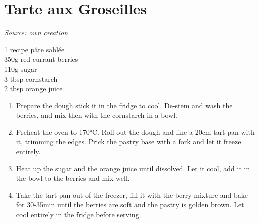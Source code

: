 \documentclass{report}
\begin{document}
\section{Tarte aux Groseilles}
\textit{Source: own creation}\\
\begin{minipage}[t]{0.21\textwidth} \vspace{0pt} 
1 recipe pâte sablée\\
350g red currant berries\\
110g sugar\\
3 tbsp cornstarch\\
2 tbsp orange juice
\end{minipage}
\hfill
\begin{minipage}[t]{0.78\textwidth} \vspace{0pt}
	\begin{enumerate}
		\item Prepare the dough stick it in the fridge to cool. De-stem and wash the berries, and mix then with the cornstarch in a bowl.
		\item Preheat the oven to 170°C. Roll out the dough and line a 20cm tart pan with it, trimming the edges. Prick the pastry base with a fork and let it freeze entirely.
		\item Heat up the sugar and the orange juice until dissolved. Let it cool, add it in the bowl to the berries and mix well.
		\item Take the tart pan out of the freezer, fill it with the berry mixture and bake for 30-35min until the berries are soft and the pastry is golden brown. Let cool entirely in the fridge before serving. 
		\end{enumerate}
	\end{minipage}
\end{document}
